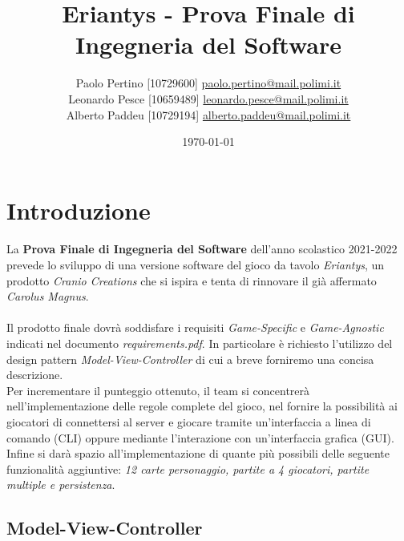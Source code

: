 \documentclass[a4paper, 12pt]{article}
\title{Eriantys - Prova Finale di Ingegneria del Software}
\author{
	Paolo Pertino [10729600]
	\href{mailto:paolo.pertino@mail.polimi.it}{paolo.pertino@mail.polimi.it} \\
	Leonardo Pesce [10659489]
	\href{mailto:leonardo.pesce@mail.polimi.it}{leonardo.pesce@mail.polimi.it} \\
	Alberto Paddeu [10729194]
	\href{mailto:alberto.paddeu@mail.polimi.it}{alberto.paddeu@mail.polimi.it} \\
}
\begin{document}
	\date{\today}
	\maketitle
	\newpage
	
	\tableofcontents
	
	\newpage
	\section{Introduzione}
	\paragraph{}
	La \textbf{Prova Finale di Ingegneria del Software} dell'anno scolastico 2021-2022 prevede lo sviluppo di una versione software del gioco da tavolo \emph{Eriantys}, un prodotto \emph{Cranio Creations}\cite{eriantys} che si ispira e tenta di rinnovare il già affermato \emph{Carolus Magnus}\cite{carolusMagnus}.
	
	\paragraph{}
	Il prodotto finale dovrà soddisfare i requisiti \emph{Game-Specific} e \emph{Game-Agnostic} indicati nel documento \emph{requirements.pdf}. In particolare è richiesto l'utilizzo del design pattern \emph{Model-View-Controller} di cui a breve forniremo una concisa descrizione.\\
	Per incrementare il punteggio ottenuto, il team si concentrerà nell'implementazione delle regole complete del gioco, nel fornire la possibilità ai giocatori di connettersi al server e giocare tramite un'interfaccia a linea di comando (CLI) oppure mediante l'interazione con un'interfaccia grafica (GUI). Infine si darà spazio all'implementazione di quante più possibili delle seguente funzionalità aggiuntive: \emph{12 carte personaggio, partite a 4 giocatori, partite multiple e persistenza}.
	
	\subsection{Model-View-Controller}
\end{document}
